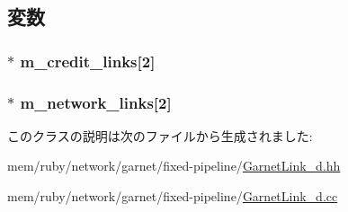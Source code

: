 \subsection{変数}
\hypertarget{classGarnetExtLink__d_a860e58e5ab24bd1c98b1af5d9054ee8c}{
\subsubsection[{m\_\-credit\_\-links}]{$\ast$ {\bf m\_\-credit\_\-links}\mbox{[}2\mbox{]}}}
\label{classGarnetExtLink__d_a860e58e5ab24bd1c98b1af5d9054ee8c}
\hypertarget{classGarnetExtLink__d_ab17adecfd76f3cd9cdd715b6e49dc199}{
\subsubsection[{m\_\-network\_\-links}]{$\ast$ {\bf m\_\-network\_\-links}\mbox{[}2\mbox{]}}}
\label{classGarnetExtLink__d_ab17adecfd76f3cd9cdd715b6e49dc199}


このクラスの説明は次のファイルから生成されました:\begin{DoxyCompactItemize}
\item 
mem/ruby/network/garnet/fixed-\/pipeline/\hyperlink{GarnetLink__d_8hh}{GarnetLink\_\-d.hh}\item 
mem/ruby/network/garnet/fixed-\/pipeline/\hyperlink{GarnetLink__d_8cc}{GarnetLink\_\-d.cc}\end{DoxyCompactItemize}
